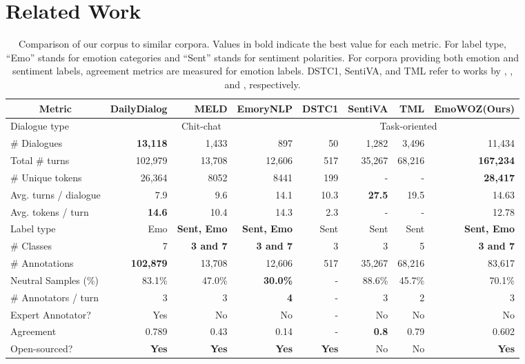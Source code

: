 \documentclass[10pt, a4paper]{article}
\begin{document}
\section{Related Work}

\begin{table*}[t]
\centering
\footnotesize
\setlength \tabcolsep{4pt}
\begin{tabular}{l|rrr|rrrr}
\toprule[1pt]
\multicolumn{1}{c|}{\textbf{Metric}} & \textbf{DailyDialog} & \textbf{MELD} & \textbf{EmoryNLP} & \textbf{DSTC1} & \textbf{SentiVA} & \textbf{TML} & \textbf{EmoWOZ(Ours)}\\
\hline 
Dialogue type & \multicolumn{3}{c|}{Chit-chat} & \multicolumn{4}{c}{Task-oriented} \\
\# Dialogues & \textbf{13,118} & 1,433 & 897 & 50 & 1,282 & 3,496 & 11,434 \\
Total \# turns & 102,979 & 13,708 & 12,606 & 517 & 35,267 & 68,216 & \textbf{167,234}\\
\# Unique tokens & 26,364 & 8052 & 8441 & 199 & - & - & \textbf{28,417} \\
Avg. turns / dialogue & 7.9 & 9.6 & 14.1 & 10.3 & \textbf{27.5} & 19.5 & 14.63\\
Avg. tokens / turn & \textbf{14.6} & 10.4 & 14.3 & 2.3 & - & - & 12.78 \\
Label type & Emo & \textbf{Sent, Emo} & \textbf{Sent, Emo} & Sent & Sent & Sent & \textbf{Sent, Emo} \\
\# Classes & 7 & \textbf{3 and 7} & \textbf{3 and 7} & 3 & 3 & 5 & \textbf{3 and 7} \\
\# Annotations & \textbf{102,879} & 13,708 & 12,606 & 517 & 35,267 & 68,216 & 83,617 \\
Neutral Samples (\%) & 83.1\% & 47.0\% & \textbf{30.0\%} & - & 88.6\% & 45.7\% & 70.1\% \\
\# Annotators / turn & 3 & 3 & \textbf{4} & - & 3 & 2 & 3 \\
Expert Annotator? & Yes & No & No & - & No & No & No \\
Agreement & 0.789 & 0.43 & 0.14 & - & \textbf{0.8} & 0.79 & 0.602 \\
Open-sourced? & \textbf{Yes} & \textbf{Yes} & \textbf{Yes} & \textbf{Yes} & No & No & \textbf{Yes} \\
\bottomrule[1pt]
\end{tabular}
\caption{Comparison of our corpus to similar corpora. Values in bold indicate the best value for each metric. For label type, ``Emo'' stands for emotion categories and ``Sent'' stands for sentiment polarities. For corpora providing both emotion and sentiment labels, agreement metrics are measured for emotion labels. DSTC1, SentiVA, and TML refer to works by \protect{}, \protect{}, and \protect{}, respectively.}
\label{tab:dataset-comparison}
\vspace*{-3mm}
\end{table*}
\end{document}

